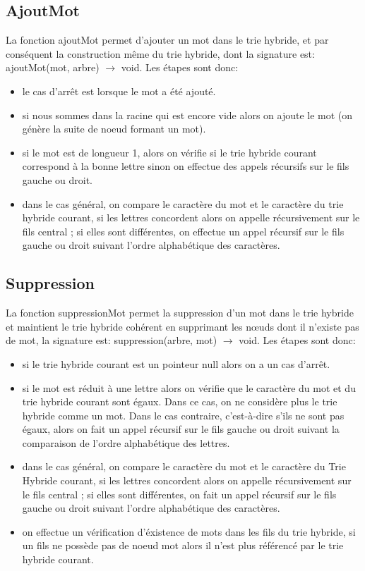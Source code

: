 \documentclass[a4paper,12pt]{report}
\begin{document}
\subsection{AjoutMot}
La fonction ajoutMot permet d'ajouter un mot dans le trie hybride, et par conséquent la construction même du trie hybride,
dont la signature est: ajoutMot(mot, arbre) $\rightarrow$ void.
Les étapes sont donc:
\begin{itemize}
 \item le cas d'arrêt est lorsque le mot a été ajouté.
 \item si nous sommes dans la racine qui est encore vide alors on ajoute le mot (on génère la suite de noeud formant un mot).
 \item si le mot est de longueur 1, alors on vérifie si le trie hybride courant correspond à la bonne lettre
 sinon on effectue des appels récursifs sur le fils gauche ou droit.
 \item dans le cas général, on compare le caractère du mot et le caractère du trie hybride courant, si les lettres
 concordent alors on appelle récursivement sur le fils central ; si elles sont différentes, on effectue un appel récursif sur le
 fils gauche ou droit suivant l'ordre alphabétique des caractères.
\end{itemize}

\subsection{Suppression}
La fonction suppressionMot permet la suppression d'un mot dans le trie hybride et maintient le trie hybride cohérent en supprimant
les nœuds dont il n'existe pas de mot, la signature est: suppression(arbre, mot) $\rightarrow$ void.
Les étapes sont donc:
\begin{itemize}
 \item si le trie hybride courant est un pointeur null alors on a un cas d'arrêt.
 \item si le mot est réduit à une lettre alors on vérifie que le caractère du mot et du trie hybride courant sont égaux. Dans ce cas, on ne considère plus le trie hybride comme un mot. Dans le cas contraire, c'est-à-dire s'ils ne sont
 pas égaux, alors on fait un appel récursif sur le fils gauche ou droit suivant la comparaison de l'ordre alphabétique des lettres.
 \item dans le cas général, on compare le caractère du mot et le caractère du Trie Hybride courant, si les lettres
 concordent alors on appelle récursivement sur le fils central ; si elles sont différentes, on fait un appel récursif sur le
 fils gauche ou droit suivant l'ordre alphabétique des caractères.
 \item on effectue un vérification d'éxistence de mots dans les fils du trie hybride, si un fils ne possède pas de noeud mot
 alors il n'est plus référencé par le trie hybride courant.
\end{itemize}
\end{document}
